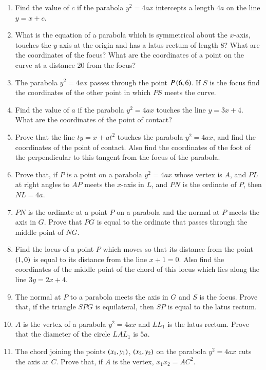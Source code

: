 \renewcommand{\theequation}{\theenumi}
\begin{enumerate}[label=\arabic*.,ref=\thesubsection.\theenumi]
\item Find the value of $c$ if the parabola $y^2=4ax$ intercepts
a length $4a$ on the line $y = x+c$.
\item What is the equation of a parabola which is symmetrical
about the $x$-axis, touches the $y$-axis at the origin and has a latus
rectum of length 8?  What are the coordinates of the focus?   What are the coordinates of a
point on the curve at a distance 20 from the focus?
\item The parabola $y^2=4ax$ passes through the point $P \left(6,6\right)$.  If $S$
is the focus find the coordinates of the other point in which $PS$ meets the curve.
\item Find the value of $a$ if the parabola $y^2=4ax$ touches the line $y = 3x+4$.  
What are the coordinates of the point of contact?
\item Prove that the line $ty=x+at^2$ touches the parabola $y^2=4ax$, and find
the coordinates of the point of contact.  Also find the coordinates of the foot of the
perpendicular to this tangent from the focus of the parabola.
\item  Prove that, if $P$ is a point on a parabola $y^2=4ax$ whose vertex
is $A$, and $PL$ at right angles to $AP$ meets the $x$-axis in $L$,  and $PN$
is the ordinate of $P$, then $NL=4a$.
\item $PN$ is the ordinate at a point $P$ on a parabola and the normal at $P$ meets
the axis in $G$.  Prove that $PG$ is equal to the ordinate that passes through the middle
point of $NG$.  
\item Find the locus of a point $P$ which moves so that its distance from the point
$\left(1,0\right)$ is equal to its distance from the line $x+1=0$.  Also find the coordinates
of the middle point of the chord of this locus which lies along the line $3y=2x+4$.  
\item The normal at $P$ to a parabola meets the axis in $G$ and $S$ is the focus.  Prove that,
if the triangle $SPG$ is equilateral, then $SP$ is equal to the latus rectum.
\item $A$ is the vertex of a parabola $y^2=4ax$ and $LL_1$ is the latus rectum.
Prove that the diameter of the circle $LAL_1$ is $5a$.
\item The chord joining the points $\left(x_1,y_1\right)$, $\left(x_2,y_2\right)$ on the parabola
$y^2=4ax$ cuts the axis at $C$.  Prove that, if $A$ is the vertex, $x_1x_2 = AC^2$.  

\end{enumerate}
